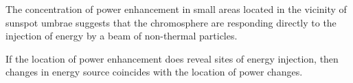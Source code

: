 The concentration of power enhancement in small areas
located in the vicinity of sunspot umbrae suggests that
 the chromosphere
are responding directly to the injection of energy by
a beam of non-thermal particles.

If the location of power enhancement does reveal sites of energy injection,
then  changes in energy source coincides
with the location of power changes.

